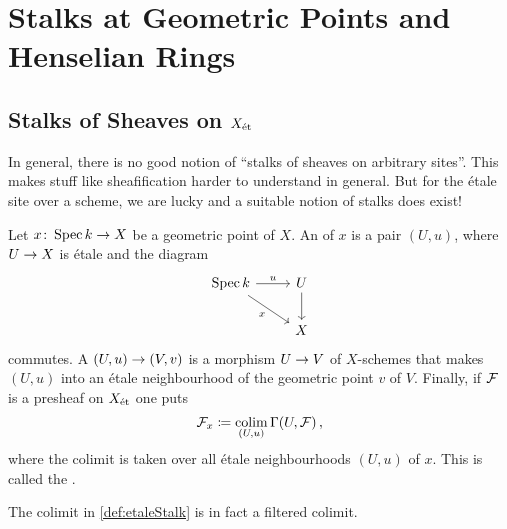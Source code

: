\section{Stalks at Geometric Points and Henselian Rings}
\subsection{Stalks of Sheaves on \texorpdfstring{$X_{\mathrm{\acute{e}t}}$}{Xet}}
In general, there is no good notion of \enquote{stalks of sheaves on arbitrary sites}. This makes stuff like sheafification harder to understand in general. But for the étale site over a scheme, we are lucky and a suitable notion of stalks does exist!

\begin{defi}\label{def:etaleStalk}
	Let $x\colon \Spec k\morphism X$ be a geometric point of $X$. An  of $x$ is a pair $(U,u)$, where $U\morphism X$ is étale and the diagram
	\begin{equation*}
		\begin{tikzcd}
			\Spec k\rar["u"]\drar["x"{swap}]& U\dar\\
			 & X\end{tikzcd}
	\end{equation*}
	commutes. A  $(U,u)\morphism(V,v)$ is a morphism $U\morphism V$ of $X$-schemes that makes $(U,u)$ into an étale neighbourhood of the geometric point $v$ of $V$. Finally, if $\mathcal{F}$ is a presheaf on $X_{\mathrm{\acute{e}t}}$ one puts
	\begin{equation*}
		\mathcal{F}_x\coloneqq \operatorname*{colim}_{(U,u)}\operatorname{\Gamma}(U,\mathcal{F})\,,
	\end{equation*}
	where the colimit is taken over all étale neighbourhoods $(U,u)$ of $x$. This is called the .
\end{defi}
\begin{fact}\label{fact:filtered}
	The colimit in \cref{def:etaleStalk} is in fact a filtered colimit.
\end{fact}
